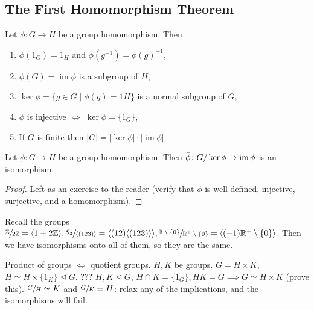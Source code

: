 \subsection{The First Homomorphism Theorem}
\begin{remark}
    Let $ \phi \colon G \to H$ be a group homomorphism. Then
    \begin{enumerate}
        \item $\phi(1_G)=1_H$ and $\phi(g^{-1})=\phi(g)^{-1}$,
        \item $\phi(G) = \operatorname{im}\phi$ is a subgroup of $H$,
        \item $\ker \phi = \{g\in G \mid \phi(g)=1 H\} $ is a normal subgroup of $G$,
        \item $\phi$ is injective $\iff$ $\ker \phi = \{1_G\}$,
        \item If $G$ is finite then $|G|=|\ker \phi|\cdot |\operatorname{im} \phi|$.
    \end{enumerate}
\end{remark}
\begin{theorem}
    Let $ \phi \colon G \to H$ be a group homomorphism. Then $\bar{\phi} \colon G/\ker\phi \to \operatorname{im} \phi$ is an isomorphism.
\end{theorem}
\begin{proof}
    Left as an exercise to the reader (verify that $\bar{\phi}$ is well-defined, injective, surjective, and a homomorphism).
\end{proof}
\begin{example}
    Recall the groups $\sfrac{\mathbb{Z}}{2\mathbb{Z}} = \langle 1+2\mathbb{Z} \rangle, \sfrac{S_3}{\langle (123) \rangle} = \langle (12)\langle (123) \rangle  \rangle, \sfrac{\mathbb{R}\setminus \{0\} }{\mathbb{R}^{+}\setminus \{0\} } = \langle (-1)\mathbb{R}^{+}\setminus \{0\}  \rangle $. Then we have isomorphisms onto all of them, so they are the same.
\end{example}
\begin{remark}
    Product of groups $\iff$ quotient groups. $H, K$ be groups. $G=H\times K$, $H \simeq H \times \{1_K\} \trianglelefteq G$. ??? $H,K \trianglelefteq G$, $H \cap K = \{1_G\} , HK=G \implies G \simeq H \times K$ (prove this). $\sfrac{G}{H} \simeq K$ and $\sfrac{G}{K}=H$: relax any of the implications, and the isomorphisms will fail.
\end{remark}


